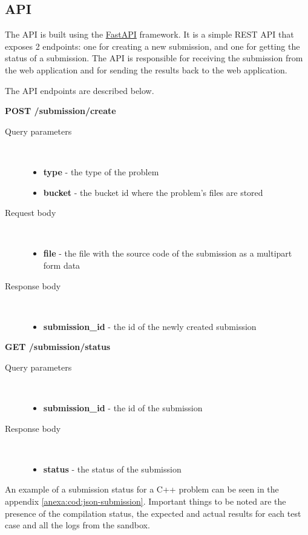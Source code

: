 \documentclass[12pt,a4paper]{report}
\begin{document}
\subsection{API}
The API is built using the \href{https://fastapi.tiangolo.com/}{FastAPI} framework. It is a simple REST API that exposes 2 endpoints: one for creating a new submission, and one for getting the status of a submission. The API is responsible for receiving the submission from the web application and for sending the results back to the web application.

The API endpoints are described below.

\textbf{POST /submission/create}
\begin{description}
	\item[Query parameters]\
		\begin{itemize}
			\item \textbf{type} - the type of the problem
			\item \textbf{bucket} - the bucket id where the problem's files are stored
		\end{itemize}
	\item[Request body]\
		\begin{itemize}
			\item \textbf{file} - the file with the source code of the submission as a multipart form data
		\end{itemize}
	\item[Response body]\
		\begin{itemize}
			\item \textbf{submission\_id} - the id of the newly created submission
		\end{itemize}
\end{description}

\newpage
\textbf{GET /submission/status}
\begin{description}
	\item[Query parameters]\
		\begin{itemize}
			\item \textbf{submission\_id} - the id of the submission
		\end{itemize}
	\item[Response body]\
		\begin{itemize}
			\item \textbf{status} - the status of the submission
		\end{itemize}
\end{description}

An example of a submission status for a C++ problem can be seen in the appendix \ref{anexa:cod:json-submission}. Important things to be noted are the presence of the compilation status, the expected and actual results for each test case and all the logs from the sandbox.
\end{document}
